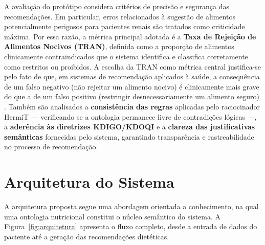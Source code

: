 \documentclass[12pt, a4paper, twocolumn]{article}
\begin{document}
A avaliação do protótipo considera critérios de precisão e segurança das recomendações. Em particular, erros relacionados à sugestão de alimentos potencialmente perigosos para pacientes renais são tratados como criticidade máxima. Por essa razão, a métrica principal adotada é a \textbf{Taxa de Rejeição de Alimentos Nocivos (TRAN)}, definida como a proporção de alimentos clinicamente contraindicados que o sistema identifica e classifica corretamente como restritos ou proibidos. A escolha da TRAN como métrica central justifica-se pelo fato de que, em sistemas de recomendação aplicados à saúde, a consequência de um falso negativo (não rejeitar um alimento nocivo) é clinicamente mais grave do que a de um falso positivo (restringir desnecessariamente um alimento seguro) \cite{mckensy2022}. Também são analisados a \textbf{consistência das regras} aplicadas pelo raciocinador HermiT --- verificando se a ontologia permanece livre de contradições lógicas ---, a \textbf{aderência às diretrizes KDIGO/KDOQI} e a \textbf{clareza das justificativas semânticas} fornecidas pelo sistema, garantindo transparência e rastreabilidade no processo de recomendação.

\section{Arquitetura do Sistema}

A arquitetura proposta segue uma abordagem orientada a conhecimento, na qual uma ontologia nutricional constitui o núcleo semântico do sistema. A Figura~\ref{fig:arquitetura} apresenta o fluxo completo, desde a entrada de dados do paciente até a geração das recomendações dietéticas.
\end{document}
